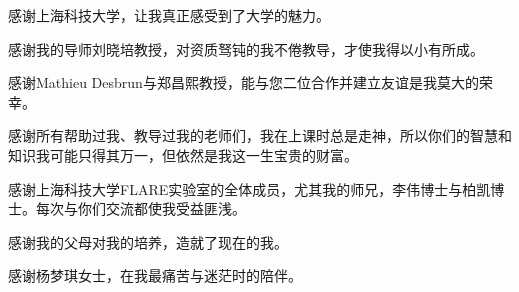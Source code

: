 \begin{acknowledgement}
    感谢上海科技大学，让我真正感受到了大学的魅力。

    感谢我的导师刘晓培教授，对资质驽钝的我不倦教导，才使我得以小有所成。

    感谢Mathieu Desbrun与郑昌熙教授，能与您二位合作并建立友谊是我莫大的荣幸。

    感谢所有帮助过我、教导过我的老师们，我在上课时总是走神，所以你们的智慧和知识我可能只得其万一，但依然是我这一生宝贵的财富。

    感谢上海科技大学FLARE实验室的全体成员，尤其我的师兄，李伟博士与柏凯博士。每次与你们交流都使我受益匪浅。

    感谢我的父母对我的培养，造就了现在的我。

    感谢杨梦琪女士，在我最痛苦与迷茫时的陪伴。
\end{acknowledgement}